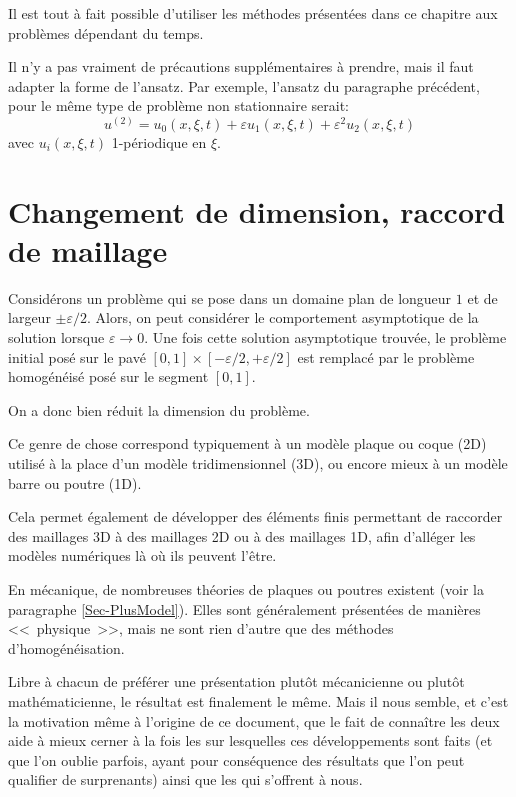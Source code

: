 Il est tout à fait possible d'utiliser les méthodes présentées dans ce chapitre
aux problèmes dépendant du temps.

Il n'y a pas vraiment de précautions supplémentaires à prendre, mais il faut adapter
la forme de l'ansatz.
Par exemple, l'ansatz du paragraphe précédent, pour le même type de problème
non stationnaire serait:
\begin{equation}u^{(2)} = u_0(x,\xi,t)+\varepsilon u_1(x,\xi,t) + \varepsilon^2 u_2(x,\xi,t)\end{equation}
avec $u_i(x,\xi,t)$ 1-périodique en $\xi$.





\medskip
\section{Changement de dimension, raccord de maillage}


\medskip
Considérons un problème qui se pose dans un domaine plan de longueur $1$ et de largeur $\pm\varepsilon/2$.
Alors, on peut considérer le comportement asymptotique de la solution lorsque $\varepsilon \longrightarrow 0$.
Une fois cette solution asymptotique trouvée, le problème initial posé sur le pavé
$[0,1]\times[-\varepsilon/2,+\varepsilon/2]$ est remplacé par le problème homogénéisé
posé sur le segment $[0,1]$.

On a donc bien réduit la dimension du problème.

\medskip
Ce genre de chose correspond typiquement à un modèle plaque ou coque (2D) utilisé à la place
d'un modèle tridimensionnel (3D), ou encore mieux à un modèle barre ou poutre (1D).

Cela permet également de développer des éléments finis permettant de raccorder
des maillages 3D à des maillages 2D ou à des maillages 1D, afin d'alléger les modèles numériques
là où ils peuvent l'être.

\medskip
En mécanique, de nombreuses théories de plaques ou poutres existent (voir la paragraphe \ref{Sec-PlusModel}).
Elles sont généralement présentées de manières <<~physique~>>, mais ne sont rien d'autre que des
méthodes d'homogénéisation.

Libre à chacun de préférer une présentation plutôt mécanicienne ou plutôt mathématicienne,
le résultat est finalement le même. Mais il nous semble, et c'est la motivation même à l'origine de
ce document, que le fait de connaître les deux aide à mieux cerner à la fois les 
sur lesquelles ces développements sont faits (et que l'on oublie parfois, ayant pour conséquence
des résultats que l'on peut qualifier de surprenants) ainsi que les  qui s'offrent
à nous. 
